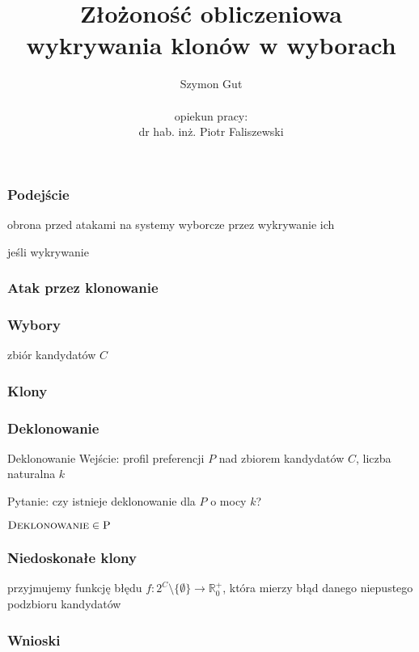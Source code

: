 \documentclass{beamer}
\begin{document}
	
\title[Złożoność obliczeniowa wykrywania klonów w wyborach]{Złożoność obliczeniowa\\ wykrywania klonów w wyborach}
\author[Szymon Gut]{Szymon Gut\\ \hfill \\opiekun pracy:\\dr hab. inż. Piotr Faliszewski}
\date{}
\frame{\titlepage}


\begin{frame} \frametitle{Podejście}
  obrona przed atakami na systemy wyborcze przez wykrywanie ich

  jeśli wykrywanie 
\end{frame}

\begin{frame} \frametitle{Atak przez klonowanie}

\end{frame}

\begin{frame} \frametitle{Wybory}
  zbiór kandydatów $C$
\end{frame}

\begin{frame} \frametitle{Klony}

\end{frame}

\begin{frame} \frametitle{Deklonowanie}
  \begin{aproblem}{Deklonowanie}
    Wejście: profil preferencji $P$ nad zbiorem kandydatów $C$, liczba naturalna $k$

    Pytanie: czy istnieje deklonowanie dla $P$ o mocy $k$?
  \end{aproblem}

  $\textsc{Deklonowanie} \in \text{P}$

\end{frame} 

\begin{frame} \frametitle{Niedoskonałe klony}
  przyjmujemy funkcję błędu $f: 2^C \setminus \{\emptyset\} \rightarrow \mathbb{R}_0^+$,
  która mierzy błąd danego niepustego podzbioru kandydatów 
\end{frame}

\begin{frame} \frametitle{Wnioski}
  
\end{frame}

\frame{\titlepage}
\end{document}
